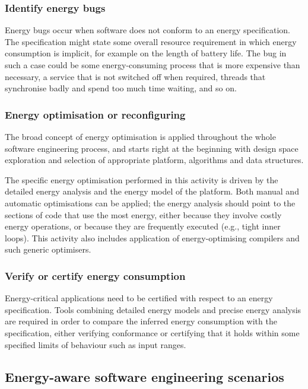 \documentclass[11pt,oneside]{book}
\begin{document}
\subsubsection{Identify energy bugs}\label{energy-bugs}
Energy bugs occur when software does not conform to an energy specification.
The specification might state some overall resource requirement in which
energy consumption is implicit, for example on the length of battery life.  The
bug in such a case could be some energy-consuming process that is more
expensive than necessary, a service that is not switched off when required,
threads that synchronise badly and spend too much time waiting, and so on.


\subsubsection{Energy optimisation or reconfiguring}\label{energy-opt}

The broad concept of energy optimisation is applied throughout the whole software
engineering process, and starts
right at the beginning with design space exploration and selection of appropriate platform,
algorithms and data structures.

The specific energy optimisation performed in this activity 
is driven by the detailed energy analysis
and the energy model of the platform.  Both manual and automatic
optimisations can be applied; the energy analysis should point to the sections of
code that use the most energy, either because they involve costly energy operations,
or because they are frequently executed (e.g., tight inner loops).
This activity also includes application of energy-optimising compilers and such
generic optimisers.

\subsubsection{Verify or certify energy consumption}\label{certify}

Energy-critical applications need to be certified with respect to an
energy specification. Tools combining detailed energy models and
precise energy analysis are required in order to compare the inferred
energy consumption with the specification, either verifying conformance or 
certifying that it holds within some specified limits of behaviour such
as input ranges.


\subsection{Energy-aware software engineering scenarios}\label{sweng-scenarios}
\end{document}
